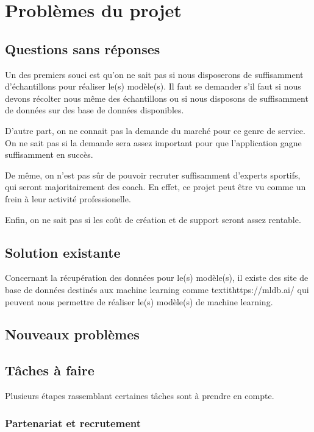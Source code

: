 
\chapter{Problèmes du projet}

\section{Questions sans réponses}

Un des premiers souci est qu'on ne sait pas si nous disposerons de suffisamment d'échantillons pour réaliser le(s) modèle(s). Il faut se demander s'il faut si nous devons récolter nous même des échantillons ou si nous disposons de suffisamment de données sur des base de données disponibles.

D'autre part, on ne connait pas la demande du marché pour ce genre de service. On ne sait pas si la demande sera assez important pour que l'application gagne suffisamment en succès.

De même, on n'est pas sûr de pouvoir recruter suffisamment d'experts sportifs, qui seront majoritairement des coach. En effet, ce projet peut être vu comme un frein à leur activité professionelle. 

Enfin, on ne sait pas si les coût de création et de support seront assez rentable.  

\section{Solution existante}

Concernant la récupération des données pour le(s) modèle(s), il existe des site de base de données destinés aux machine learning comme textit{https://mldb.ai/} qui peuvent nous permettre de réaliser le(s) modèle(s) de machine learning.

\section{Nouveaux problèmes}

\section{Tâches à faire}

Plusieurs étapes rassemblant certaines tâches sont à prendre en compte. 

\subsection*{Partenariat et recrutement}

